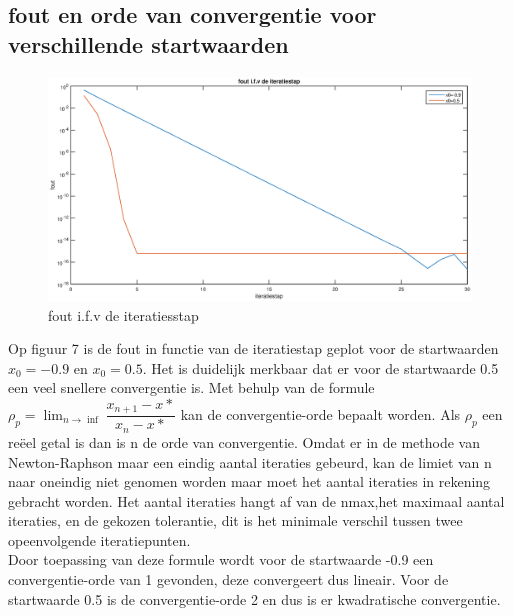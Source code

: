 \documentclass{article}
\begin{document}
\subsection{fout en orde van convergentie voor verschillende startwaarden}
\begin{center}
\begin{figure}[h!]
\includegraphics[width=0.75\columnwidth]{figuur_3}
\caption{fout i.f.v de iteratiesstap} %
\end{figure}
\end{center}
Op figuur 7 is de fout in functie van de iteratiestap geplot voor de startwaarden $x_{0}=-0.9$ en $x_{0}=0.5$. Het is duidelijk merkbaar dat er voor de startwaarde 0.5 een veel snellere convergentie is. Met behulp van de formule $\rho_{p}=\lim_{n \rightarrow \inf } \dfrac{x_{n+1}-x{*}}{x_{n}-x{*}}$ kan de convergentie-orde bepaalt worden. Als $\rho_{p} $ een reëel getal is dan is n de orde van convergentie. Omdat er in de methode van Newton-Raphson maar een eindig aantal iteraties gebeurd, kan de limiet van n naar oneindig niet genomen worden maar moet het aantal iteraties in rekening gebracht worden. Het aantal iteraties hangt af van de nmax,het maximaal aantal iteraties, en de gekozen tolerantie, dit is het minimale verschil tussen twee opeenvolgende iteratiepunten. \\
Door toepassing van deze formule wordt voor de startwaarde -0.9 een convergentie-orde van 1 gevonden, deze convergeert dus lineair. Voor de startwaarde 0.5 is de convergentie-orde 2 en dus is er kwadratische convergentie.
\end{document}

